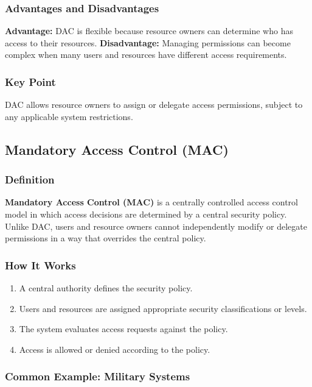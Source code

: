 \documentclass[11pt,a4paper]{article}
\begin{document}
\subsubsection{Advantages and Disadvantages}

\textbf{Advantage:} DAC is flexible because resource owners can determine who has access to their resources.
\textbf{Disadvantage:} Managing permissions can become complex when many users and resources have different access requirements.

\subsubsection{Key Point}

DAC allows resource owners to assign or delegate access permissions, subject to any applicable system restrictions.

\subsection{Mandatory Access Control (MAC)}

\subsubsection{Definition}

\textbf{Mandatory Access Control (MAC)} is a centrally controlled access control model in which access decisions are determined by a central security policy.
Unlike DAC, users and resource owners cannot independently modify or delegate permissions in a way that overrides the central policy.

\subsubsection{How It Works}

\begin{enumerate}
    \item A central authority defines the security policy.
    \item Users and resources are assigned appropriate security classifications or levels.
    \item The system evaluates access requests against the policy.
    \item Access is allowed or denied according to the policy.
\end{enumerate}

\subsubsection{Common Example: Military Systems}
\end{document}

